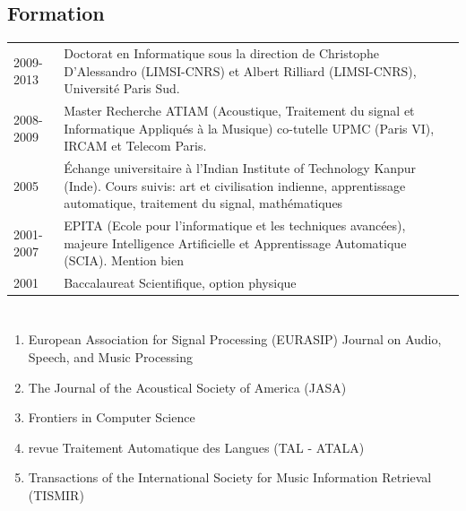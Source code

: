 \begin{fr}
\section{Formation}
\begin{tabularx}{\linewidth}{@{}l X@{}}	
2009-2013 & Doctorat en Informatique sous la direction de Christophe D’Alessandro (LIMSI-CNRS) et Albert Rilliard (LIMSI-CNRS), Université Paris Sud.\\
2008-2009 & Master Recherche ATIAM (Acoustique, Traitement du signal et Informatique Appliqués à la Musique) co-tutelle UPMC (Paris VI), IRCAM et Telecom Paris.\\
2005 & \'Echange universitaire à l'Indian Institute of Technology Kanpur (Inde). Cours suivis: art et civilisation indienne, apprentissage automatique, traitement du signal, mathématiques\\
2001-2007 & EPITA (Ecole pour l'informatique et les techniques avancées), majeure Intelligence Artificielle et Apprentissage Automatique (SCIA). Mention bien\\
2001 & Baccalaureat Scientifique, option physique\\
\end{tabularx}
\end{fr}




\section{\EvalSec}
\subsection{\EvalJournal}
\begin{enumerate}[nosep, after=\strut, leftmargin=1em, itemsep=3pt]
\item European Association for Signal Processing (EURASIP) Journal on Audio, Speech, and Music Processing
\item The Journal of the Acoustical Society of America (JASA)
\item Frontiers in Computer Science
\item revue Traitement Automatique des Langues (TAL - ATALA)
\item Transactions of the International Society for Music Information Retrieval (TISMIR)
\end{enumerate}
